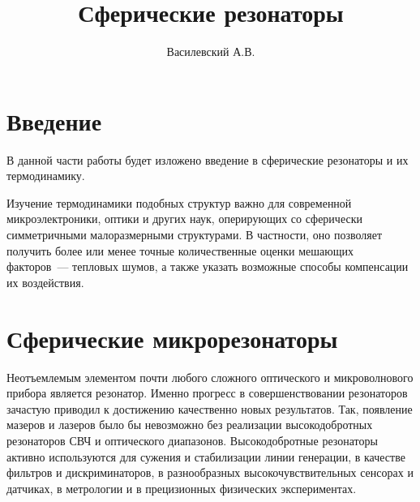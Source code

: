 \documentclass[12pt,a4paper]{article}
\title{Сферические резонаторы}
\author{Василевский А.В.}
\begin{document}
    \maketitle
    \tableofcontents


    \section*{Введение}

        В данной части работы будет изложено введение в сферические резонаторы и их термодинамику.

        Изучение термодинамики подобных структур важно для современной микроэлектроники, оптики и других наук, оперирующих со сферически симметричными малоразмерными структурами. В частности, оно позволяет получить более или менее точные количественные оценки мешающих факторов~--- тепловых шумов, а также указать возможные способы компенсации их воздействия.


    \section{Сферические микрорезонаторы}

        Неотъемлемым элементом почти любого сложного оптического и микроволнового прибора является резонатор. Именно прогресс в совершенствовании резонаторов зачастую приводил к достижению качественно новых результатов. Так, появление мазеров и лазеров было бы невозможно без реализации высокодобротных резонаторов СВЧ и оптического диапазонов. Высокодобротные резонаторы активно используются для сужения и стабилизации линии генерации, в качестве фильтров и дискриминаторов, в разнообразных высокочувствительных сенсорах и датчиках, в метрологии и в прецизионных физических экспериментах. \cite{microresonators}
\end{document}
